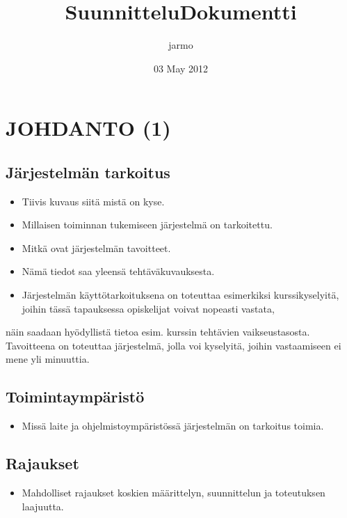 \documentclass[11pt]{article}
\title{SuunnitteluDokumentti}
\author{jarmo}
\date{03 May 2012}
\begin{document}
\maketitle

\setcounter{tocdepth}{3}
\tableofcontents
\vspace*{1cm}
\section{JOHDANTO (1)}
\label{sec-1}

\subsection{Järjestelmän tarkoitus}
\label{sec-1.1}

\begin{itemize}
\item Tiivis kuvaus siitä mistä on kyse.
\item Millaisen toiminnan tukemiseen järjestelmä on tarkoitettu.
\item Mitkä ovat järjestelmän tavoitteet.
\item Nämä tiedot saa yleensä tehtäväkuvauksesta.
\item Järjestelmän käyttötarkoituksena on toteuttaa esimerkiksi kurssikyselyitä, joihin tässä tapauksessa opiskelijat voivat nopeasti vastata,
\end{itemize}
  näin saadaan hyödyllistä tietoa esim. kurssin tehtävien vaikseustasosta.
  Tavoitteena on toteuttaa järjestelmä, jolla voi kyselyitä, joihin vastaamiseen ei mene yli minuuttia.

\subsection{Toimintaympäristö}
\label{sec-1.2}

\begin{itemize}
\item Missä laite ja ohjelmistoympäristössä järjestelmän on tarkoitus toimia.
\end{itemize}
\subsection{Rajaukset}
\label{sec-1.3}

\begin{itemize}
\item Mahdolliset rajaukset koskien määrittelyn, suunnittelun ja toteutuksen laajuutta.
\end{itemize}
\end{document}
